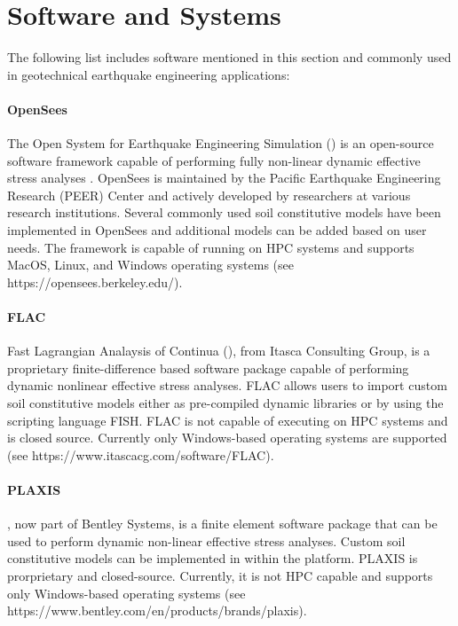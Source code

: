 \section{Software and Systems}
\label{sec:eq_landslide_tools}

The following list includes software mentioned in this section and commonly used in geotechnical earthquake engineering applications:

\paragraph{OpenSees}
The Open System for Earthquake Engineering Simulation () is an open-source software framework capable of performing fully non-linear dynamic effective stress analyses \citep{mckenna2011opensees}. OpenSees is maintained by the Pacific Earthquake Engineering Research (PEER) Center and actively developed by researchers at various research institutions. Several commonly used soil constitutive models have been implemented in OpenSees and additional models can be added based on user needs. The framework is capable of running on HPC systems and supports MacOS, Linux, and Windows operating systems (see https://opensees.berkeley.edu/).

\paragraph{FLAC}
Fast Lagrangian Analaysis of Continua (), from Itasca Consulting Group, is a proprietary finite-difference based software package capable of performing dynamic nonlinear effective stress analyses. FLAC allows users to import custom soil constitutive models either as pre-compiled dynamic libraries or by using the scripting language FISH. FLAC is not capable of executing on HPC systems and is closed source. Currently only Windows-based operating systems are supported (see https://www.itascacg.com/software/FLAC).

\paragraph{PLAXIS}
, now part of Bentley Systems, is a finite element software package that can be used to perform dynamic non-linear effective stress analyses. Custom soil constitutive models can be implemented in within the platform. PLAXIS is prorprietary and closed-source. Currently, it is not HPC capable and supports only Windows-based operating systems (see https://www.bentley.com/en/products/brands/plaxis).

